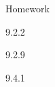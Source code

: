 \begin{frame}{Homework}
  \begin{center}

  9.2.2

  \vspace{2em}

  9.2.9

  \vspace{2em}

  9.4.1

  \end{center}
\end{frame}








